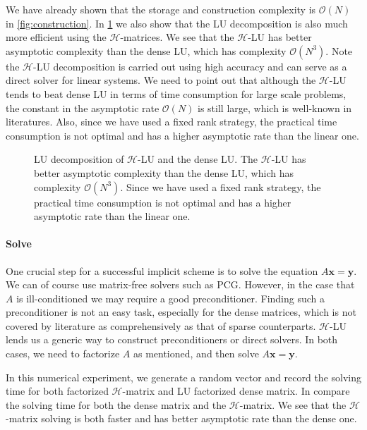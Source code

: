 \documentclass[3p,,preprint,12pt]{elsarticle}
\newcommand{\bx}[0]{\mathbf{x}}
\theoremstyle{definition}
\newcommand{\by}[0]{\mathbf{y}}
\begin{document}
We have already shown that the storage and construction complexity is $\mathcal{O}(N)$ in \cref{fig:construction}. In \cref{fig:lu} we also show that the LU decomposition is also much more efficient using the $\mathcal{H}$-matrices. We see that the $\mathcal{H}$-LU has better asymptotic complexity than the dense LU, which has complexity $\mathcal{O}(N^3)$. Note the $\mathcal{H}$-LU decomposition is carried out using high accuracy and can serve as a direct solver for linear systems. We need to point out that although the $\mathcal{H}$-LU tends to beat dense LU in terms of time consumption for large scale problems, the constant in the asymptotic rate $\mathcal{O}(N)$ is still large, which is well-known in literatures. Also, since we have used a fixed rank strategy, the practical time consumption is not optimal and has a higher asymptotic rate than the linear one. 

\begin{figure}[htpb]
\centering
\scalebox{0.6}{}
\caption{LU decomposition of $\mathcal{H}$-LU and the dense LU. The $\mathcal{H}$-LU has better asymptotic complexity than the dense LU, which has complexity $\mathcal{O}(N^3)$. Since we have used a fixed rank strategy, the practical time consumption is not optimal and has a higher asymptotic rate than the linear one.}
\label{fig:lu}
\end{figure}



\paragraph{Solve}

One crucial step for a successful implicit scheme is to solve the equation $A\bx=\by$. We can of course use matrix-free solvers such as PCG. However, in the case that $A$ is ill-conditioned we may require a good preconditioner. Finding such a preconditioner is not an easy task, especially for the dense matrices, which is not covered by literature as comprehensively as that of sparse counterparts. $\mathcal{H}$-LU lends us a generic way to construct preconditioners or direct solvers. In both cases, we need to factorize $A$ as mentioned, and then solve $A\bx=\by$. 

In this numerical experiment, we generate a random vector and record the solving time for both factorized $\mathcal{H}$-matrix and LU factorized dense matrix. In  compare the solving time for both the dense matrix and the $\mathcal{H}$-matrix. We see that the $\mathcal{H}$-matrix solving is both faster and has better asymptotic rate than the dense one.
\end{document}
